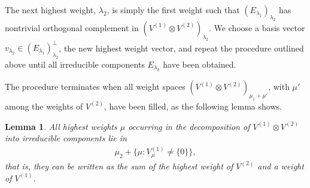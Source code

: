 \documentclass[11pt,reqno]{amsart}
\newtheorem{lemma}{Lemma}[section]
\theoremstyle{remark}
\theoremstyle{definition}
\begin{document}
The next highest weight, $\lambda_2$, is simply the first weight such that $(E_{\lambda_1})_{\lambda_2}$ has nontrivial orthogonal complement in $(V^{(1)} \otimes V^{(2)})_{\lambda_2}$. We choose a basis vector $v_{\lambda_2} \in (E_{\lambda_1})_{\lambda_2}^\bot$, the new highest weight vector, and repeat the procedure outlined above until all irreducible components $E_{\lambda_k}$ have been obtained.

The procedure terminates when all weight spaces $(V^{(1)} \otimes V^{(2)})_{\mu_1 + \mu'}$, with $\mu'$ among the weights of $V^{(2)}$, have been filled, as the following lemma shows.

\begin{lemma}
    \label{lem:tensor_weigths}
    All highest weights $\mu$ occurring in the decomposition of $V^{(1)} \otimes V^{(2)}$ into irreducible components lie in 
    \begin{align*}
        \mu_2 + \{\mu: V^{(1)}_{\mu} \neq \{0\} \},
    \end{align*}
    that is, they can be written as the sum of the highest weight of $V^{(2)}$ and a weight of $V^{(1)}$.
\end{lemma}
\end{document}
